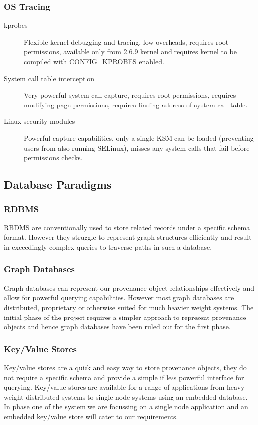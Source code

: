 \subsubsection{OS Tracing}
\begin{description}
\item[kprobes] Flexible kernel debugging and tracing, low overheads, requires root permissions, available only from 2.6.9 kernel and requires kernel to be compiled with CONFIG\_KPROBES enabled.
\item[System call table interception] Very powerful system call capture, requires root permissions, requires modifying page permissions, requires finding address of system call table.
\item[Linux security modules] Powerful capture capabilities, only a single KSM can be loaded (preventing users from also running SELinux), misses any system calls that fail before permissions checks.
\end{description}

\subsection{Database Paradigms}

\subsubsection{RDBMS}
RBDMS are conventionally used to store related records under a specific schema format. However they struggle to represent graph structures efficiently and result in exceedingly complex queries to traverse paths in such a database.

\subsubsection{Graph Databases}
Graph databases can represent our provenance object relationships effectively and allow for powerful querying capabilities. However most graph databases are distributed, proprietary or otherwise suited for much heavier weight systems. The initial phase of the project requires a simpler approach to represent provenance objects and hence graph databases have been ruled out for the first phase.

\subsubsection{Key/Value Stores}
Key/value stores are a quick and easy way to store provenance objects, they do not require a specific schema and provide a simple if less powerful interface for querying. Key/value stores are available for a range of applications from heavy weight distributed systems to single node systems using an embedded database. In phase one of the system we are focussing on a single node application and an embedded key/value store will cater to our requirements.
